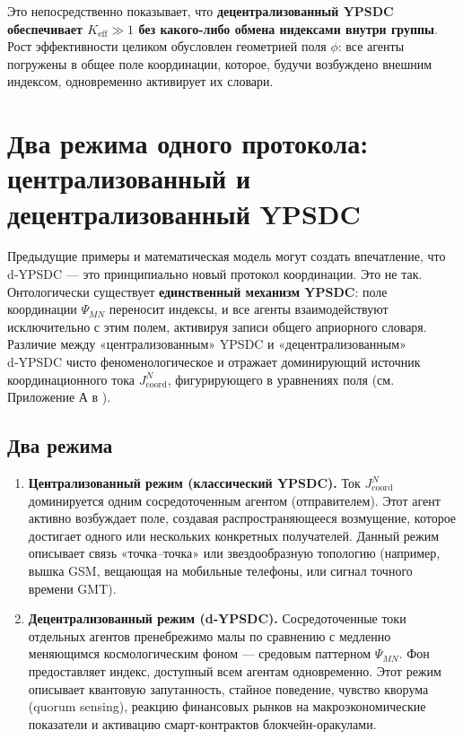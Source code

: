 \documentclass[11pt,a4paper]{article}
\begin{document}
	Это непосредственно показывает, что \textbf{децентрализованный YPSDC обеспечивает \(K_{\mathrm{eff}} \gg 1\) без какого-либо обмена индексами внутри группы}. Рост эффективности целиком обусловлен геометрией поля \(\phi\): все агенты погружены в общее поле координации, которое, будучи возбуждено внешним индексом, одновременно активирует их словари.
	
	\section{Два режима одного протокола: централизованный и децентрализованный YPSDC}
	\label{sec:two-regimes}
	
	Предыдущие примеры и математическая модель могут создать впечатление, что d‑YPSDC — это принципиально новый протокол координации. Это не так. Онтологически существует \textbf{единственный механизм YPSDC}: поле координации \(\Psi_{MN}\) переносит индексы, и все агенты взаимодействуют исключительно с этим полем, активируя записи общего априорного словаря. Различие между «централизованным» YPSDC и «децентрализованным» d‑YPSDC чисто феноменологическое и отражает доминирующий источник координационного тока \(J^{N}_{\mathrm{coord}}\), фигурирующего в уравнениях поля (см. Приложение А в \cite{YUCT}).
	
	\subsection{Два режима}
	\begin{enumerate}[leftmargin=*, label=\textbf{(\arabic*)}]
		\item \textbf{Централизованный режим (классический YPSDC).} Ток \(J^{N}_{\mathrm{coord}}\) доминируется одним сосредоточенным агентом (отправителем). Этот агент активно возбуждает поле, создавая распространяющееся возмущение, которое достигает одного или нескольких конкретных получателей. Данный режим описывает связь «точка–точка» или звездообразную топологию (например, вышка GSM, вещающая на мобильные телефоны, или сигнал точного времени GMT).
		
		\item \textbf{Децентрализованный режим (d‑YPSDC).} Сосредоточенные токи отдельных агентов пренебрежимо малы по сравнению с медленно меняющимся космологическим фоном — средовым паттерном \(\Psi_{MN}\). Фон предоставляет индекс, доступный всем агентам одновременно. Этот режим описывает квантовую запутанность, стайное поведение, чувство кворума (quorum sensing), реакцию финансовых рынков на макроэкономические показатели и активацию смарт-контрактов блокчейн-оракулами.
	\end{enumerate}
	
\end{document}
